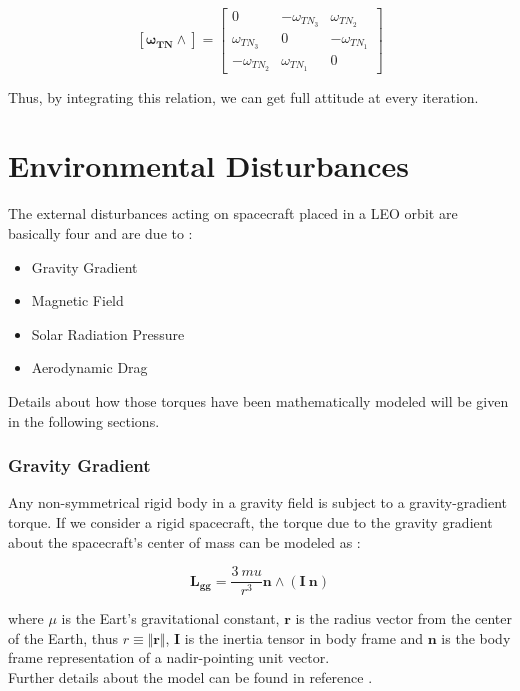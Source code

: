 \begin{equation*}
  \mathbf{[\omega_{TN} \wedge]} =
  \begin{bmatrix}
    0                & -\omega_{TN_{3}} & \omega_{TN_{2}}  \\
    \omega_{TN_{3}}  & 0                & -\omega_{TN_{1}} \\
    -\omega_{TN_{2}} & \omega_{TN_{1}}  & 0
  \end{bmatrix}
\end{equation*}

Thus, by integrating this relation, we can get full attitude at every iteration.

\section{Environmental Disturbances} \label{sec:disturbances}
The external disturbances acting on spacecraft placed in a LEO orbit are basically four and are due to :

\begin{itemize}
  \item Gravity Gradient
  \item Magnetic Field
  \item Solar Radiation Pressure
  \item Aerodynamic Drag
\end{itemize}

Details about how those torques have been mathematically modeled will be given in the following sections.

\subsubsection{Gravity Gradient}
Any non-symmetrical rigid body in a gravity field is subject to a gravity-gradient torque.
If we consider a rigid spacecraft, the torque due to the gravity gradient about the spacecraft's center of mass can be modeled as :

\begin{equation}
  \mathbf{L_{gg}} = \frac{3 \ mu}{r^3} \mathbf{n} \wedge (\mathbf{I} \ \mathbf{n})
\end{equation}

where $\mu$ is the Eart's gravitational constant, $\textbf{r}$ is the radius vector from the center of the Earth, thus $r \equiv \Vert{\textbf{r}}\Vert$, $\textbf{I}$ is the inertia tensor in body frame and $\textbf{n}$ is the body frame representation of a nadir-pointing unit vector.\\
Further details about the model can be found in reference \cite{Markley2014}.

